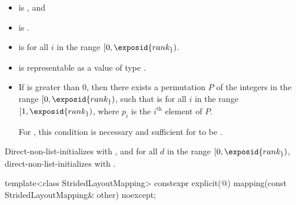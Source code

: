 \begin{itemdescr}
\pnum
\constraints
\begin{itemize}
\item
{} is , and
\item
{} is .
\end{itemize}

\pnum
\expects
\begin{itemize}
\item
{} is 
for all $i$ in the range $[0, \exposid{rank_})$.
\item
{} is representable
as a value of type .
\item
If  is greater than 0,
then there exists a permutation $P$ of the integers
in the range $[0, \exposid{rank_})$,
such that  is 
for all $i$ in the range $[1, \exposid{rank_})$,
where $p_i$ is the $i^\text{th}$ element of $P$.
\begin{note}
For ,
this condition is necessary and sufficient
for  to be .
\end{note}
\end{itemize}

\pnum
\effects
Direct-non-list-initializes  with , and
for all $d$ in the range $[0, \exposid{rank_})$,
direct-non-list-initializes  with .
\end{itemdescr}

%
\begin{itemdecl}
template<class StridedLayoutMapping>
  constexpr explicit(@\seebelow@)
    mapping(const StridedLayoutMapping& other) noexcept;
\end{itemdecl}


